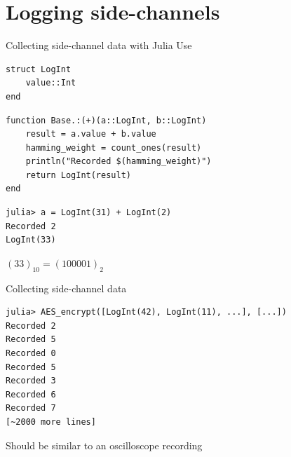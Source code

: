 
\section*{Logging side-channels}

\begin{frame}[fragile]{Collecting side-channel data with Julia}
    Use  
    \vspace{1em}
    \begin{verbatim}
struct LogInt
    value::Int
end
    \end{verbatim}
    \pause
\begin{verbatim}
function Base.:(+)(a::LogInt, b::LogInt)
    result = a.value + b.value
    hamming_weight = count_ones(result)
    println("Recorded $(hamming_weight)")
    return LogInt(result)
end
\end{verbatim}
\vspace{1em}
\pause
\begin{verbatim}
julia> a = LogInt(31) + LogInt(2)
Recorded 2
LogInt(33)
\end{verbatim}
\vspace{-2em}
\hspace{10em}
{\scriptsize $(33)_{10} = (100001)_2$}
\end{frame}

\begin{frame}[fragile]{Collecting side-channel data}

    \begin{verbatim}
julia> AES_encrypt([LogInt(42), LogInt(11), ...], [...])
Recorded 2
Recorded 5
Recorded 0
Recorded 5
Recorded 3
Recorded 6
Recorded 7
[~2000 more lines]
        \end{verbatim}
\vspace{1em}
Should be similar to an oscilloscope recording
\end{frame}


